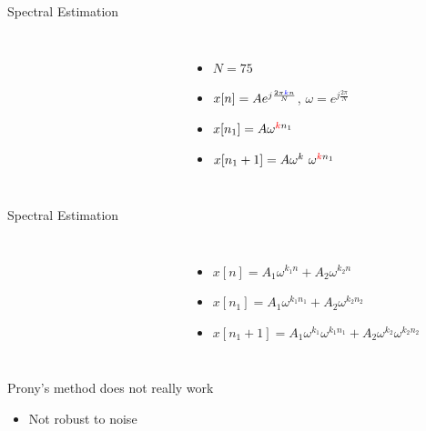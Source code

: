 \documentclass[10pt,xcolor=table]{beamer}
\begin{document}
\begin{frame}{Spectral Estimation}
	
	\begin{columns}
		
		\begin{figure}
			\centering
			\scalebox{0.60}{}
		\end{figure}
		
		\begin{figure}
			\centering
			\scalebox{0.60}{}
		\end{figure}

        \begin{itemize}
        \item $N=75$
        \item $x[n] = A e^{j \frac{2 \pi {\color{blue}{k}} n}{N}}$, $\omega = e^{j \frac{2 \pi}{N}}$
        \pause
        \item $x[n_1] = A \omega^{{\color{red}{k}}n_1}$
        \item $x[n_1+1] = A \omega^k \ \omega^{{\color{red}{k}}n_1}$
		\end{itemize}
	\end{columns}	
\end{frame}
\begin{frame}{Spectral Estimation}
	
        \begin{columns}		
		\column{0.35\textwidth}
		\begin{figure}
			\centering
			\scalebox{0.60}{}
		\end{figure}
		
		\column{0.55\textwidth}
		\begin{figure}
			\centering
			\scalebox{0.60}{}
		\end{figure}

        \begin{itemize}
        \item $x[n] = A_1 \omega^{k_1n} + A_2 \omega^{k_2 n}$
        \pause
        \item $x[n_1] = A_1 \omega^{k_1n_1} + A_2 \omega^{k_2 n_2}$
        \item $x[n_1+1] =  A_1 \omega^{k_1} \omega^{k_1n_1} + A_2 \omega^{k_2} \omega^{k_2 n_2}$
		\end{itemize}
	\end{columns}	
\pause
\begin{block}{Prony's method does not really work}
\begin{itemize}
  \item Not robust to noise
\end{itemize}
\end{block}
\end{frame}
\end{document}

